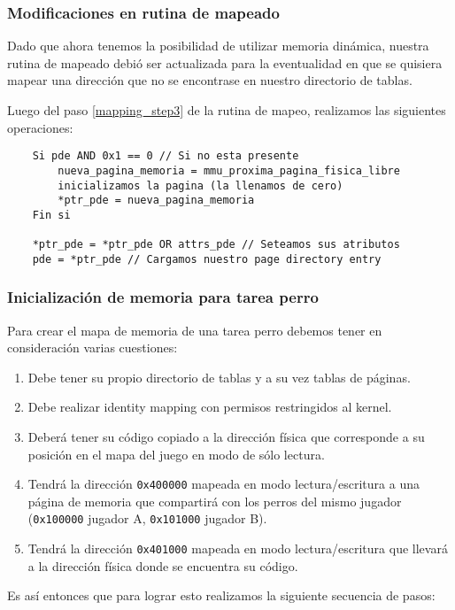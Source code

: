 \subsubsection{Modificaciones en rutina de mapeado}

Dado que ahora tenemos la posibilidad de utilizar memoria dinámica, nuestra
rutina de mapeado debió ser actualizada para la eventualidad en que se quisiera
mapear una dirección que no se encontrase en nuestro directorio de tablas.

Luego del paso \ref{mapping_step3} de la rutina de mapeo, realizamos las siguientes
operaciones:

	\begin{lstlisting}
	Si pde AND 0x1 == 0 // Si no esta presente
		nueva_pagina_memoria = mmu_proxima_pagina_fisica_libre
		inicializamos la pagina (la llenamos de cero)
		*ptr_pde = nueva_pagina_memoria
	Fin si

	*ptr_pde = *ptr_pde OR attrs_pde // Seteamos sus atributos
	pde = *ptr_pde // Cargamos nuestro page directory entry
	\end{lstlisting}

\subsubsection{Inicialización de memoria para tarea perro}

Para crear el mapa de memoria de una tarea perro debemos tener en consideración
varias cuestiones:

\begin{enumerate}
	\item Debe tener su propio directorio de tablas y a su vez tablas de
		páginas.
	\item Debe realizar identity mapping con permisos restringidos al
		kernel.
	\item Deberá tener su código copiado a la dirección física que corresponde a
		su posición en el mapa del juego en modo de sólo lectura.
	\item Tendrá la dirección \texttt{0x400000} mapeada en modo lectura/escritura a una página de memoria que compartirá
		con los perros del mismo jugador (\texttt{0x100000} jugador A,
		\texttt{0x101000} jugador B).
	\item Tendrá la dirección \texttt{0x401000} mapeada en modo lectura/escritura que llevará a
		la dirección física donde se encuentra su código.
\end{enumerate}

Es así entonces que para lograr esto realizamos la siguiente secuencia de pasos:

